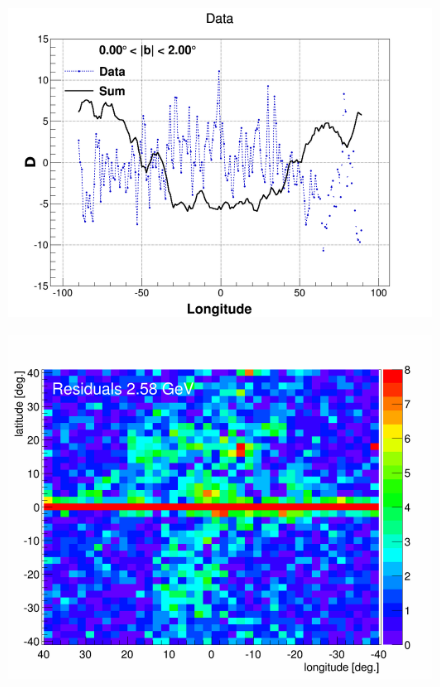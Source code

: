 \begin{figure}[h]
  \centering
  \begin{minipage}[h]{0.45\textwidth}
  	\centering
	\includegraphics[width=1.\linewidth]{pic/results/BKGonly_weniger_sum_D_0-2.png}
  	\subcaption{}
  	\label{fig:weniger_plot}
  \end{minipage}
  \hfill
  \begin{minipage}[h]{0.45\textwidth}
	  \centering
	  \includegraphics[width=1.\linewidth]{pic/results/BKGonly_halo_residuals.png}

\end{minipage}
\end{figure}

